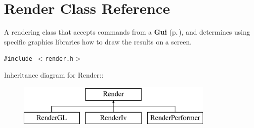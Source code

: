 \section{Render  Class Reference}
\label{class_Render}
A rendering class that accepts commands from a {\bf Gui} {\rm (p.\,\pageref{class_Gui})}, and determines using specific graphics libraries how to draw the results on a screen. 


{\tt \#include $<$render.h$>$}

Inheritance diagram for Render::\begin{figure}[H]
\begin{center}
\leavevmode
\includegraphics[height=2cm]{class_Render}
\end{center}
\end{figure}
